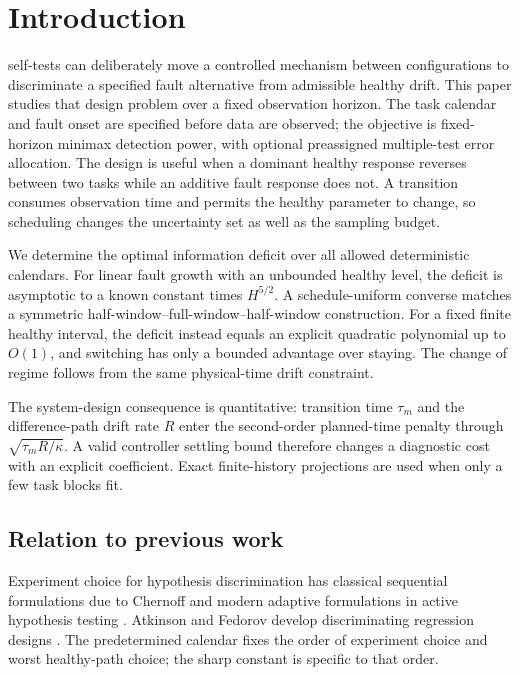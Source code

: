 \section{Introduction}
 self-tests can deliberately move a controlled mechanism between configurations to discriminate a specified fault alternative from admissible healthy drift. This paper studies that design problem over a fixed observation horizon. The task calendar and fault onset are specified before data are observed; the objective is fixed-horizon minimax detection power, with optional preassigned multiple-test error allocation. The design is useful when a dominant healthy response reverses between two tasks while an additive fault response does not. A transition consumes observation time and permits the healthy parameter to change, so scheduling changes the uncertainty set as well as the sampling budget.

We determine the optimal information deficit over all allowed deterministic calendars. For linear fault growth with an unbounded healthy level, the deficit is asymptotic to a known constant times $H^{5/2}$. A schedule-uniform converse matches a symmetric half-window--full-window--half-window construction. For a fixed finite healthy interval, the deficit instead equals an explicit quadratic polynomial up to $O(1)$, and switching has only a bounded advantage over staying. The change of regime follows from the same physical-time drift constraint.

The system-design consequence is quantitative: transition time $\tau_m$ and the difference-path drift rate $R$ enter the second-order planned-time penalty through $\sqrt{\tau_m R/\kappa}$. A valid controller settling bound therefore changes a diagnostic cost with an explicit coefficient. Exact finite-history projections are used when only a few task blocks fit.

\subsection{Relation to previous work}
Experiment choice for hypothesis discrimination has classical sequential formulations due to Chernoff \cite{chernoff} and modern adaptive formulations in active hypothesis testing \cite{naghshvar}. Atkinson and Fedorov develop discriminating regression designs \cite{atkinson}. The predetermined calendar fixes the order of experiment choice and worst healthy-path choice; the sharp constant is specific to that order.

